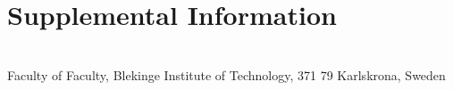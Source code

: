 \documentclass[a4paper,twoside]{bth}
\newcommand{\faculty}{Faculty}
\begin{document}











\appendix
\chapter{Supplemental Information}


\cleardoublepage
\thispagestyle{empty}
\vspace*{\fill}
\clearpage{\thispagestyle{empty}}
\changepage{3cm}{1cm}{-0.5cm}{-0.5cm}{}{-1.5cm}{}{}{}
\vspace*{\fill}
\center

{\bthcsnotextlogo{3cm}}
\\
\noindent\makebox[\linewidth]{\rule{\textwidth}{1pt}} 
Faculty of \faculty, Blekinge Institute of Technology, 371 79 Karlskrona, Sweden
\end{document}
